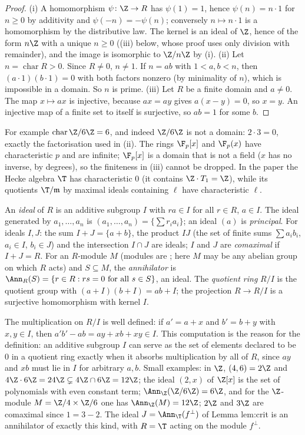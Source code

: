 \begin{proof}
(i) A homomorphism $\psi\colon\Z\to R$ has $\psi(1)=1$, hence $\psi(n)=n\cdot1$ for $n\ge0$ by additivity and $\psi(-n)=-\psi(n)$;
conversely $n\mapsto n\cdot1$ is a homomorphism by the distributive law. The kernel is an ideal of $\Z$, hence of the form $n\Z$
with a unique $n\ge0$ ((iii) below, whose proof uses only division with remainder), and the image is
isomorphic to $\Z/n\Z$ by (i).
(ii) Let $n=\operatorname{char}R>0$. Since $R\ne0$, $n\ne1$. If $n=ab$ with $1<a,b<n$, then $(a\cdot1)(b\cdot1)=0$ with both factors
nonzero (by minimality of $n$), which is impossible in a domain. So $n$ is prime.
(iii) Let $R$ be a finite domain and $a\ne0$. The map $x\mapsto ax$ is injective, because $ax=ay$ gives $a(x-y)=0$, so $x=y$.
An injective map of a finite set to itself is surjective, so $ab=1$ for some $b$.
\end{proof}

For example $\operatorname{char}\Z/6\Z=6$, and indeed $\Z/6\Z$ is not a domain: $2\cdot3=0$, exactly the factorisation used in (ii). The
rings $\F_p[x]$ and $\F_p(x)$ have characteristic $p$ and are infinite; $\F_p[x]$ is a domain that is not a field ($x$ has no inverse, by degrees),
so the finiteness in (iii) cannot be dropped. In the paper the Hecke algebra $\T$ has characteristic $0$ (it contains $\Z\cdot T_1=\Z$), while
its quotients $\T/\mathfrak m$ by maximal ideals containing $\ell$ have characteristic $\ell$.

\begin{definition}\label{def:rings:ideal}
An \emph{ideal} of $R$ is an additive subgroup $I$ with $ra\in I$ for all $r\in R$, $a\in I$. The ideal generated by
$a_1,\dots,a_n$ is $(a_1,\dots,a_n)=\{\sum r_ia_i\}$; an ideal $(a)$ is \emph{principal}. For ideals $I,J$: the sum
$I+J=\{a+b\}$, the product $IJ$ (the set of finite sums $\sum a_ib_i$, $a_i\in I$, $b_i\in J$) and the intersection $I\cap J$ are
ideals; $I$ and $J$ are \emph{comaximal} if $I+J=R$. For an $R$-module $M$ (modules are ; here $M$ may be any
abelian group on which $R$ acts) and $S\subseteq M$, the \emph{annihilator} is $\Ann_R(S)=\{r\in R:rs=0\text{ for all }s\in S\}$, an
ideal. The \emph{quotient ring} $R/I$ is the quotient group with $(a+I)(b+I)=ab+I$; the projection $R\to R/I$ is a
surjective homomorphism with kernel $I$.
\end{definition}

The multiplication on $R/I$ is well defined: if $a'=a+x$ and $b'=b+y$ with $x,y\in I$, then $a'b'-ab=ay+xb+xy\in I$.
This computation is the reason for the definition: an additive subgroup $I$ can serve as the set of elements declared to be $0$ in a quotient
ring exactly when it absorbs multiplication by all of $R$, since $ay$ and $xb$ must lie in $I$ for arbitrary $a,b$. Small examples: in $\Z$,
$(4,6)=2\Z$ and $4\Z\cdot6\Z=24\Z\subsetneq4\Z\cap6\Z=12\Z$; the ideal $(2,x)$ of $\Z[x]$ is the set of polynomials with even constant term;
$\Ann_\Z(\Z/6\Z)=6\Z$, and for the $\Z$-module $M=\Z/4\times\Z/6$ one has $\Ann_\Z(M)=12\Z$; $2\Z$ and $3\Z$ are comaximal since
$1=3-2$. The ideal $J=\Ann_\T(f^\perp)$ of Lemma lem:crit is an annihilator of exactly this kind, with $R=\T$ acting on the module $f^\perp$.

